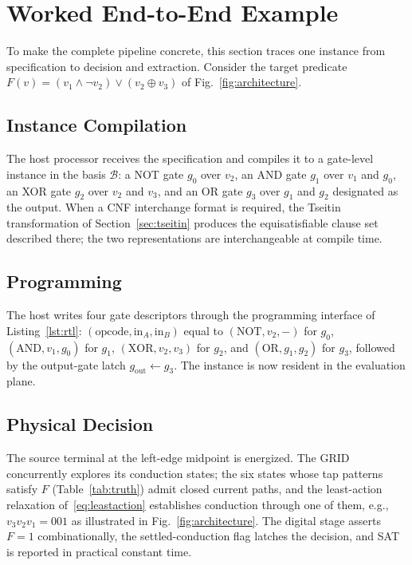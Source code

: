 \documentclass[letterpaper,journal]{IEEEtran}
\begin{document}
\section{Worked End-to-End Example}
\label{sec:worked}

To make the complete pipeline concrete, this section traces one instance
from specification to decision and extraction. Consider the target
predicate $F(v)=(v_1\land\lnot v_2)\lor(v_2\oplus v_3)$ of
Fig.~\ref{fig:architecture}.

\subsection{Instance Compilation}
The host processor receives the specification and compiles it to a
gate-level instance in the basis $\mathcal{B}$: a NOT gate $g_0$ over
$v_2$, an AND gate $g_1$ over $v_1$ and $g_0$, an XOR gate $g_2$ over
$v_2$ and $v_3$, and an OR gate $g_3$ over $g_1$ and $g_2$ designated as
the output. When a CNF interchange format is required, the Tseitin
transformation of Section~\ref{sec:tseitin} produces the equisatisfiable
clause set described there; the two representations are interchangeable
at compile time.

\subsection{Programming}
The host writes four gate descriptors through the programming interface
of Listing~\ref{lst:rtl}: $(\mathrm{opcode}, \mathrm{in}_A, \mathrm{in}_B)$
equal to $(\mathrm{NOT}, v_2, -)$ for $g_0$, $(\mathrm{AND}, v_1, g_0)$
for $g_1$, $(\mathrm{XOR}, v_2, v_3)$ for $g_2$, and
$(\mathrm{OR}, g_1, g_2)$ for $g_3$, followed by the output-gate latch
$g_{\mathrm{out}}\leftarrow g_3$. The instance is now resident in the
evaluation plane.

\subsection{Physical Decision}
The source terminal at the left-edge midpoint is energized. The GRID
concurrently explores its conduction states; the six states whose tap
patterns satisfy $F$ (Table~\ref{tab:truth}) admit closed current paths,
and the least-action relaxation of~\eqref{eq:leastaction} establishes
conduction through one of them, e.g., $v_3v_2v_1=001$ as illustrated in
Fig.~\ref{fig:architecture}. The digital stage asserts $F=1$
combinationally, the settled-conduction flag latches the decision, and
SAT is reported in practical constant time.
\end{document}

